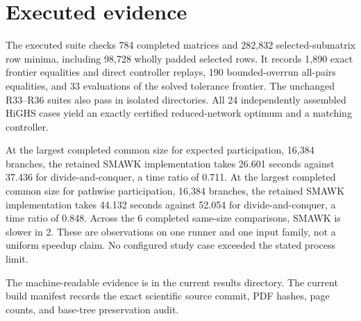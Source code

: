 \section*{Executed evidence}
The executed suite checks 784 completed matrices and 282,832 selected-submatrix row minima, including 98,728 wholly padded selected rows. It records 1,890 exact frontier equalities and direct controller replays, 190 bounded-overrun all-pairs equalities, and 33 evaluations of the solved tolerance frontier. The unchanged R33--R36 suites also pass in isolated directories. All 24 independently assembled HiGHS cases yield an exactly certified reduced-network optimum and a matching controller.


At the largest completed common size for expected participation, 16,384 branches, the retained SMAWK implementation takes 26.601 seconds against 37.436 for divide-and-conquer, a time ratio of 0.711. At the largest completed common size for pathwise participation, 16,384 branches, the retained SMAWK implementation takes 44.132 seconds against 52.054 for divide-and-conquer, a time ratio of 0.848. Across the 6 completed same-size comparisons, SMAWK is slower in 2. These are observations on one runner and one input family, not a uniform speedup claim. No configured study case exceeded the stated process limit.

The machine-readable evidence is in the current results directory. The current build manifest records the exact scientific source commit, PDF hashes, page counts, and base-tree preservation audit.
